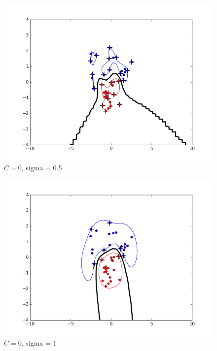 \documentclass{article}
\begin{document}
\begin{figure}[H]
\centering
\includegraphics[scale = 0.5]{figure_radial_sigma05.png}
\caption{$C=0$, sigma = 0.5}
\label{fig:4}
\end{figure}

\begin{figure}[H]
\centering
\includegraphics[scale = 0.5]{figure_radial_sigma1.png}
\caption{$C=0$, sigma = 1}
\label{fig:5}
\end{figure}
\end{document}
